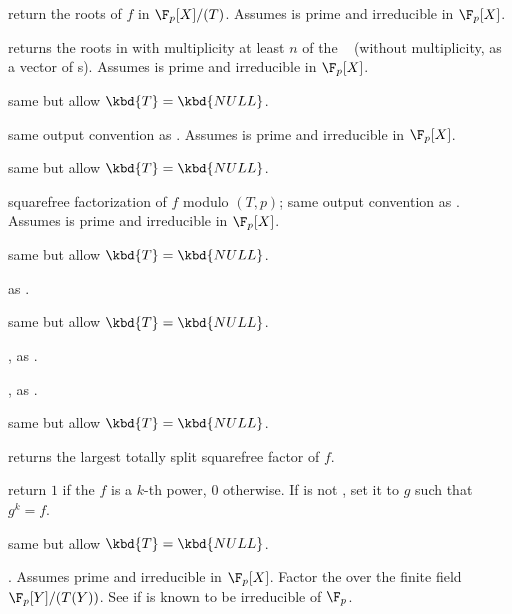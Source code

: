 
 return the roots of $f$ in
$\F_p[X]/(T)$. Assumes  is prime and  irreducible in $\F_p[X]$.

returns the roots in  with multiplicity at least $n$ of
the ~ (without multiplicity, as a vector of s).
Assumes  is prime and  irreducible in $\F_p[X]$.

 same but allow $\kbd{T} = \kbd{NULL}$.

 same output convention as
. Assumes  is prime and  irreducible
in $\F_p[X]$.

 same but allow $\kbd{T} = \kbd{NULL}$.

 squarefree
factorization of $f$ modulo $(T,p)$; same output convention as
. Assumes  is prime and 
irreducible in $\F_p[X]$.

 same but allow
$\kbd{T} = \kbd{NULL}$.

 as .

 same but allow $\kbd{T} = \kbd{NULL}$.

, as
.

, as .

 same but allow
$\kbd{T} = \kbd{NULL}$.

 returns the largest totally
split squarefree factor of $f$.

return $1$ if the  $f$ is a $k$-th power, $0$ otherwise.
If  is not , set it to $g$ such that $g^k = f$.

same but allow $\kbd{T} = \kbd{NULL}$.

. Assumes  prime
and  irreducible in $\F_p[X]$. Factor the  
over the finite field $\F_p[Y]/(T(Y))$. See 
if  is known to be irreducible of $\F_p$.

